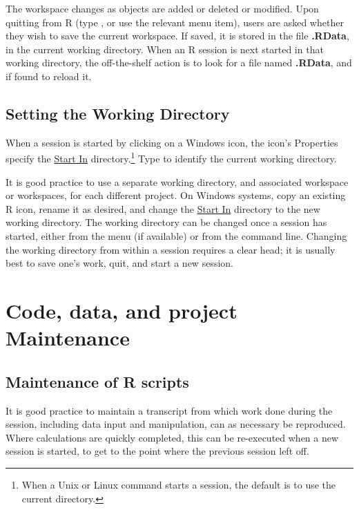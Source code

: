The workspace changes as objects are added or deleted or modified.
Upon quitting from R (type , or use the relevant menu item),
users are asked whether they wish to save the current workspace.
If saved, it is stored in the file {\bf .RData}, in the current
working directory.  When an R session is next started in that
working directory, the off-the-shelf action is to look for a file
named {\bf .RData}, and if found to reload it.

\subsection*{Setting the Working Directory}
When a session is started by clicking on a Windows icon, the icon's
Properties specify the \underline{Start In} directory.\footnote{When a
  Unix or Linux command starts a session, the default is to use the
  current directory.} Type  to identify the current
working directory.

It is good practice to use a separate working directory, and
associated workspace or workspaces, for each different project. On
Windows systems, copy an existing R icon, rename it as desired, and
change the \underline{Start In} directory to the new working
directory.  The working directory can be changed once a session has started, either from the
menu (if available) or from the command line.  Changing the working
directory from within a session requires a clear head; it is usually
best to save one's work, quit, and start a new session.

\section{Code, data, and project Maintenance}

\subsection{Maintenance of R scripts}

  It is good practice to maintain a transcript
from which work done during the session, including data input and
manipulation, can as necessary be reproduced.  Where calculations are
quickly completed, this can be re-executed when a new session is
started, to get to the point where the previous session left off.

